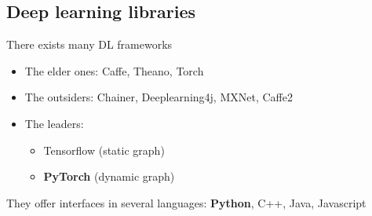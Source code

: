 \documentclass[usenames,dvipsnames]{beamer}
\begin{document}
    \subsection[DL libraries]{Deep learning libraries}
    \begin{frame}{\secname}{\subsecname}
        There exists many DL frameworks
        \begin{itemize}
            \item The elder ones: Caffe, Theano, Torch
            \item The outsiders: Chainer, Deeplearning4j, MXNet, Caffe2
            \item The leaders: 
            \begin{itemize}
                \item Tensorflow (static graph) \href{https://www.tensorflow.org/}{}
                \item \textbf{PyTorch} (dynamic graph) \href{https://pytorch.org}{}
            \end{itemize}
        \end{itemize}
        They offer interfaces in several languages: \textbf{Python}, C++, Java, Javascript
    \end{frame}
    
\end{document}
